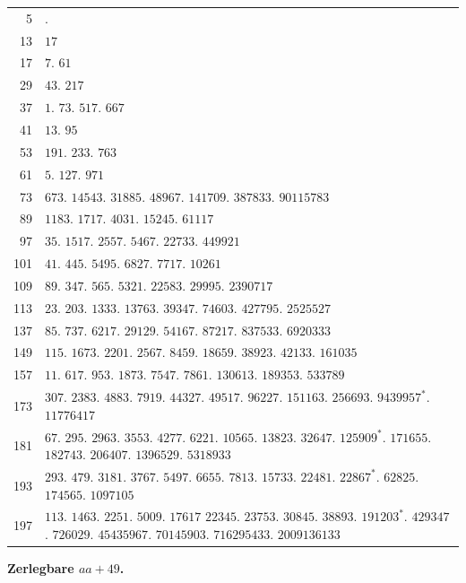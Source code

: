 \begin{longtable}{@{}r|p{\dimexpr\linewidth-38pt\relax}@{}}
5 & .\\
13 & $17$\\
17 & $7$. $61$\\
29 & $43$. $217$\\
37 & $1$. $73$. $517$. $667$\\
41 & $13$. $95$\\
53 & $191$. $233$. $763$\\
61 & $5$. $127$. $971$\\
73 & $673$. $14543$. $31885$. $48967$. $141709$. $387833$. $90115783$\\
89 & $1183$. $1717$. $4031$. $15245$. $61117$\\
97 & $35$. $1517$. $2557$. $5467$. $22733$. $449921$\\
101 & $41$. $445$. $5495$. $6827$. $7717$. $10261$\\
109 & $89$. $347$. $565$. $5321$. $22583$. $29995$. $2390717$\\
113 & $23$. $203$. $1333$. $13763$. $39347$. $74603$. $427795$. $2525527$\\
137 & $85$. $737$. $6217$. $29129$. $54167$. $87217$. $837533$. $6920333$\\
149 & $115$. $1673$. $2201$. $2567$. $8459$. $18659$. $38923$. $42133$. $161035$\\
157 & $11$. $617$. $953$. $1873$. $7547$. $7861$. $130613$. $189353$. $533789$\\
173 & $307$. $2383$. $4883$. $7919$. $44327$. $49517$. $96227$. $151163$. $256693$. $9439957^{*}$. $11776417$\\
181 & $67$. $295$. $2963$. $3553$. $4277$. $6221$. $10565$. $13823$. $32647$. $125909^{*}$. $171655$. $182743$. $206407$. $1396529$. $5318933$\\
193 & $293$. $479$. $3181$. $3767$. $5497$. $6655$. $7813$. $15733$. $22481$. $22867^{*}$. $62825$. $174565$. $1097105$\\
197 & $113$. $1463$. $2251$. $5009$. $17617$ $22345$. $23753$. $30845$. $38893$. $191203^{*}$. $429347$. $726029$. $45435967$. $70145903$. $716295433$. $2009136133$\\
\end{longtable}\endgroup
\par{}
\begin{center}\textbf{Zerlegbare $aa+49$.}\end{center}
\begingroup\small\setlength{\tabcolsep}{5pt}
